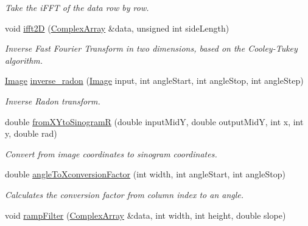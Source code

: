 \begin{DoxyCompactItemize}
\begin{DoxyCompactList}\small\item\em \-Take the i\-F\-F\-T of the data row by row. \end{DoxyCompactList}\item 
void \hyperlink{namespacesimrec_1_1algorithms_a1e135b7132c6eaa3e35de2e890423f07}{ifft2\-D} (\hyperlink{classsimrec_1_1ComplexArray}{\-Complex\-Array} \&data, unsigned int side\-Length)
\begin{DoxyCompactList}\small\item\em \-Inverse \-Fast \-Fourier \-Transform in two dimensions, based on the \-Cooley-\/\-Tukey algorithm. \end{DoxyCompactList}\item 
\hyperlink{classsimrec_1_1Image}{\-Image} \hyperlink{namespacesimrec_1_1algorithms_a719042c377348602f0e773ae4acbfd6c}{inverse\-\_\-radon} (\hyperlink{classsimrec_1_1Image}{\-Image} input, int angle\-Start, int angle\-Stop, int angle\-Step)
\begin{DoxyCompactList}\small\item\em \-Inverse \-Radon transform. \end{DoxyCompactList}\item 
double \hyperlink{namespacesimrec_1_1algorithms_af1b320ffc5a3ffcc5fd1768d26428f60}{from\-X\-Yto\-Sinogram\-R} (double input\-Mid\-Y, double output\-Mid\-Y, int x, int y, double rad)
\begin{DoxyCompactList}\small\item\em \-Convert from image coordinates to sinogram coordinates. \end{DoxyCompactList}\item 
\hypertarget{namespacesimrec_1_1algorithms_ac3ae62bccd131ced7f33a5c7b202603d}{double \hyperlink{namespacesimrec_1_1algorithms_ac3ae62bccd131ced7f33a5c7b202603d}{angle\-To\-Xconversion\-Factor} (int width, int angle\-Start, int angle\-Stop)}\label{namespacesimrec_1_1algorithms_ac3ae62bccd131ced7f33a5c7b202603d}

\begin{DoxyCompactList}\small\item\em \-Calculates the conversion factor from column index to an angle. \end{DoxyCompactList}\item 
\hypertarget{namespacesimrec_1_1algorithms_aabe59bf3544ee211a44bc030c4fded43}{void \hyperlink{namespacesimrec_1_1algorithms_aabe59bf3544ee211a44bc030c4fded43}{ramp\-Filter} (\hyperlink{classsimrec_1_1ComplexArray}{\-Complex\-Array} \&data, int width, int height, double slope)}\label{namespacesimrec_1_1algorithms_aabe59bf3544ee211a44bc030c4fded43}


\end{DoxyCompactItemize}
